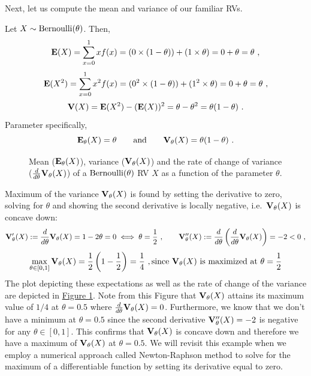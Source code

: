 Next, let us compute the mean and variance of our familiar RVs.

\begin{example}
Let $X \sim \mbox{{\rm Bernoulli}}(\theta)$.  Then, 
\[
\mathbf{E}(X) = \sum_{x=0}^1 x f(x) = (0 \times (1-\theta)) + (1 \times \theta) = 0+\theta=\theta \ ,
\]
\[
\e(X^2) =  \sum_{x=0}^1 x^2 f(x) =  (0^2 \times (1-\theta) ) + (1^2 \times \theta) = 0+\theta= \theta \ ,
\]
\[
\mathbf{V}(X) = \mathbf{E}(X^2) - (\mathbf{E}(X))^2 = \theta - \theta^2 = \theta(1-\theta) \ .
\]
Parameter specifically,
\[
\mathbf{E}_{\theta}(X)=\theta \qquad \text{and} \qquad \mathbf{V}_{\theta}(X)=\theta(1-\theta) \ .
\]
\begin{figure}[htpb]
\caption{Mean ($\mathbf{E}_{\theta}(X)$), variance ($\mathbf{V}_{\theta}(X)$) and the rate of change of variance ($\frac{d}{d \theta} \mathbf{V}_{\theta}(X)$) of a $\mbox{{\rm Bernoulli}}(\theta)$ RV $X$ as a function of the parameter $\theta$.\label{F:MeanVarBernoulli}}
\centering   {}
\end{figure}

Maximum of the variance $\mathbf{V}_{\theta}(X)$ is found by setting the derivative to zero, solving for $\theta$ and showing the second derivative is locally negative, i.e.~$\mathbf{V}_{\theta}(X)$ is concave down:
\[
\mathbf{V}_{\theta}'(X) := \frac{d}{d \theta} \mathbf{V}_{\theta}(X) = 1-2 \theta = 0  \iff \theta = \frac{1}{2} \ , 
\qquad \mathbf{V}_{\theta}''(X) := \frac{d}{d \theta} \left( \frac{d}{d \theta} \mathbf{V}_{\theta}(X) \right) = -2 < 0 \ ,
\]
\[
\max_{\theta \in [0,1]} \mathbf{V}_{\theta}(X) = \frac{1}{2} \left(1-\frac{1}{2} \right) = \frac{1}{4} \ , 
\text{since $\mathbf{V}_{\theta}(X)$ is maximized at $\theta = \frac{1}{2}$}
\]
The plot depicting these expectations as well as the rate of change of the variance are depicted in \hyperref[F:MeanVarBernoulli]{Figure \ref*{F:MeanVarBernoulli}}.  Note from this Figure that $\mathbf{V}_{\theta}(X)$ attains its maximum  value of $1/4$ at $\theta=0.5$ where $\frac{d}{d\theta}\mathbf{V}_{\theta}(X)=0$.  Furthermore, we know that we don't have a minimum at $\theta=0.5$ since the second derivative $\mathbf{V}_{\theta}''(X) = -2$ is negative for any $\theta \in [0,1]$.  This confirms that $\mathbf{V}_{\theta}(X)$ is concave down and therefore we have a maximum of $\mathbf{V}_{\theta}(X)$ at $\theta=0.5$.  We will revisit this example when we employ a numerical approach called Newton-Raphson method to solve for the maximum of a differentiable function by setting its derivative equal to zero.
\end{example}

